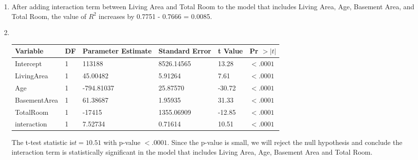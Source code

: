 \documentclass{article}
\begin{document}
\begin{enumerate}[leftmargin = 0 em, label = \arabic*., font = \bfseries]
\begin{enumerate}
	\item 
	After adding interaction term between Living Area and Total Room to the model that includes Living Area, Age, Basement Area, and Total Room, the value of $R^2$ increases by  0.7751 - 0.7666 = 0.0085.

	\item \ 

	\begin{tabular}{llllll}
	\toprule
 Variable&DF&Parameter Estimate&Standard Error&t Value&Pr $> |t|$\\
 \midrule
Intercept&1&113188&8526.14565&13.28&$<.0001$\\
LivingArea&1&45.00482&5.91264&7.61&$<.0001$\\
Age&1&-794.81037&25.87570&-30.72&$<.0001$\\
BasementArea&1&61.38687&1.95935&31.33&$<.0001$\\
TotalRoom&1&-17415&1355.06909&-12.85&$<.0001$\\
interaction&1&7.52734&0.71614&10.51&$<.0001$\\
\bottomrule
	\end{tabular}

	The t-test statistic is$ t = 10.51$ with p-value $< .0001$. Since the p-value is small, we will reject the null hypothesis and conclude the interaction term is statistically significant in the model that includes Living Area, Age, Basement Area and Total Room.
\end{enumerate}

	


	
	
	


\end{enumerate}

	
\end{document}

